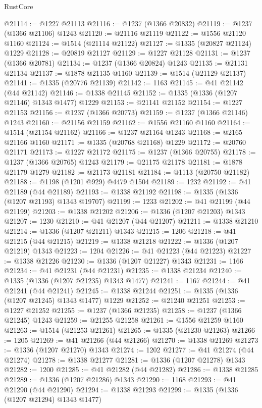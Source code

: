 \begin{lexlean}{RustCore}
\begin{coremodule}
@21114 := @1227 @21113
@21116 := @1237 (@1366 @20832)
@21119 := @1237 (@1366 @21106) @1243
@21120 := @21116 @21119
@21122 := @1556 @21120 @1160
@21124 := @1514 (@21114 @21122)
@21127 := @1335 (@20827 @21124) @1229
@21128 := @20819 @21127
@21129 := @1227 @21128
@21131 := @1237 (@1366 @20781)
@21134 := @1237 (@1366 @20824) @1243
@21135 := @21131 @21134
@21137 := @1878 @21135 @1160
@21139 := @1514 (@21129 @21137)
@21141 := @1335 (@20776 @21139)
@21142 := 1163
@21145 := @41 @21142 (@44 @21142)
@21146 := @1338 @21145
@21152 := @1335 (@1336 (@1207 @21146) @1343 @1477) @1229
@21153 := @21141 @21152
@21154 := @1227 @21153
@21156 := @1237 (@1366 @20773)
@21159 := @1237 (@1366 @21146) @1243
@21160 := @21156 @21159
@21162 := @1556 @21160 @1160
@21164 := @1514 (@21154 @21162)
@21166 := @1237 @21164 @1243
@21168 := @2165 @21166 @1160
@21171 := @1335 (@20768 @21168) @1229
@21172 := @20760 @21171
@21173 := @1227 @21172
@21175 := @1237 (@1366 @20755)
@21178 := @1237 (@1366 @20765) @1243
@21179 := @21175 @21178
@21181 := @1878 @21179 @1279
@21182 := @21173 @21181
@21184 := @1113 (@20750 @21182)
@21188 := @1198 (@1201 @929) @4479 @1504
@21189 := 1232
@21192 := @41 @21189 (@44 @21189)
@21193 := @1338 @21192
@21198 := @1335 (@1336 (@1207 @21193) @1343 @19707)
@21199 := 1233
@21202 := @41 @21199 (@44 @21199)
@21203 := @1338 @21202
@21206 := @1336 (@1207 @21203) @1343
@21207 := 1230
@21210 := @41 @21207 (@44 @21207)
@21211 := @1338 @21210
@21214 := @1336 (@1207 @21211) @1343
@21215 := 1206
@21218 := @41 @21215 (@44 @21215)
@21219 := @1338 @21218
@21222 := @1336 (@1207 @21219) @1343
@21223 := 1204
@21226 := @41 @21223 (@44 @21223)
@21227 := @1338 @21226
@21230 := @1336 (@1207 @21227) @1343
@21231 := 1166
@21234 := @41 @21231 (@44 @21231)
@21235 := @1338 @21234
@21240 := @1335 (@1336 (@1207 @21235) @1343 @1477)
@21241 := 1167
@21244 := @41 @21241 (@44 @21241)
@21245 := @1338 @21244
@21251 := @1335 (@1336 (@1207 @21245) @1343 @1477) @1229
@21252 := @21240 @21251
@21253 := @1227 @21252
@21255 := @1237 (@1366 @21235)
@21258 := @1237 (@1366 @21245) @1243
@21259 := @21255 @21258
@21261 := @1556 @21259 @1160
@21263 := @1514 (@21253 @21261)
@21265 := @1335 (@21230 @21263)
@21266 := 1205
@21269 := @41 @21266 (@44 @21266)
@21270 := @1338 @21269
@21273 := @1336 (@1207 @21270) @1343
@21274 := 1202
@21277 := @41 @21274 (@44 @21274)
@21278 := @1338 @21277
@21281 := @1336 (@1207 @21278) @1343
@21282 := 1200
@21285 := @41 @21282 (@44 @21282)
@21286 := @1338 @21285
@21289 := @1336 (@1207 @21286) @1343
@21290 := 1168
@21293 := @41 @21290 (@44 @21290)
@21294 := @1338 @21293
@21299 := @1335 (@1336 (@1207 @21294) @1343 @1477)

\end{coremodule}
\end{lexlean}
